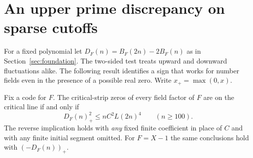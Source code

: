 \section{An upper prime discrepancy on sparse cutoffs}\label{sec:sparse}
For a fixed polynomial let $D_F(n)=B_F(2n)-2B_F(n)$ as in Section~\ref{sec:foundation}. The two-sided test treats upward and downward fluctuations alike. The following result identifies a sign that works for number fields even in the presence of a possible real zero. Write $x_+=\max(0,x)$.

\begin{theorem}\label{thm:oneside}
Fix a code for $F$. The critical-strip zeros of every field factor of $F$ are on the critical line if and only if
\[
     D_F(n)_+^2\le nC^2L(2n)^4\qquad(n\ge100).
\]
The reverse implication holds with \emph{any} fixed finite coefficient in place of $C$ and with any finite initial segment omitted. For $F=X-1$ the same conclusions hold with $(-D_F(n))_+$.
\end{theorem}
